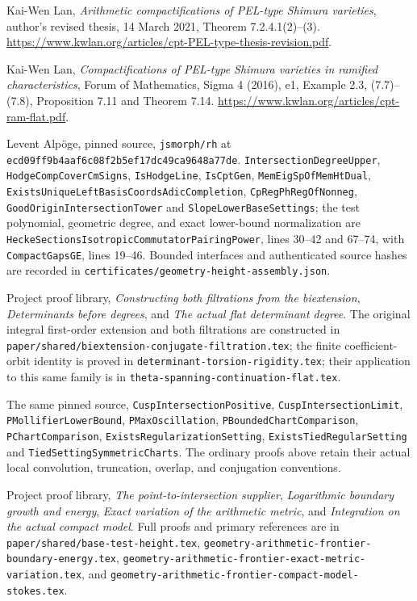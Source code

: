 Kai-Wen Lan, \emph{Arithmetic compactifications of PEL-type Shimura
varieties}, author's revised thesis, 14 March 2021,
Theorem 7.2.4.1(2)--(3).
\url{https://www.kwlan.org/articles/cpt-PEL-type-thesis-revision.pdf}.

Kai-Wen Lan, \emph{Compactifications of PEL-type Shimura varieties
in ramified characteristics}, Forum of Mathematics, Sigma 4 (2016), e1,
Example 2.3, (7.7)--(7.8), Proposition 7.11 and Theorem 7.14.
\url{https://www.kwlan.org/articles/cpt-ram-flat.pdf}.

Levent Alp\"oge, pinned source, \texttt{jsmorph/rh} at
\texttt{ecd09ff9b4aaf6c08f2b5ef17dc49ca9648a77de}.
\texttt{IntersectionDegreeUpper},
\texttt{HodgeCompCoverCmSigns},
\texttt{IsHodgeLine}, \texttt{IsCptGen},
\texttt{MemEigSpOfMemHtDual},
\texttt{ExistsUniqueLeftBasisCoordsAdicCompletion},
\texttt{CpRegPhRegOfNonneg},
\texttt{GoodOriginIntersectionTower} and
\texttt{SlopeLowerBaseSettings}; the test polynomial, geometric degree,
and exact lower-bound normalization are
\texttt{HeckeSectionsIsotropicCommutatorPairingPower}, lines 30--42
and 67--74, with \texttt{CompactGapsGE}, lines 19--46.
Bounded interfaces and authenticated source hashes are recorded in
\texttt{certificates/geometry-height-assembly.json}.

Project proof library,
\emph{Constructing both filtrations from the biextension},
\emph{Determinants before degrees}, and
\emph{The actual flat determinant degree}.
The original integral first-order extension and both filtrations
are constructed in \texttt{paper/shared/biextension-conjugate-filtration.tex};
the finite coefficient-orbit identity is proved in
\texttt{determinant-torsion-rigidity.tex}; their application to this
same family is in \texttt{theta-spanning-continuation-flat.tex}.

The same pinned source,
\texttt{CuspIntersectionPositive}, \texttt{CuspIntersectionLimit},
\texttt{PMollifierLowerBound}, \texttt{PMaxOscillation},
\texttt{PBoundedChartComparison}, \texttt{PChartComparison},
\texttt{ExistsRegularizationSetting},
\texttt{ExistsTiedRegularSetting} and
\texttt{TiedSettingSymmetricCharts}.
The ordinary proofs above retain their actual local convolution,
truncation, overlap, and conjugation conventions.

Project proof library,
\emph{The point-to-intersection supplier},
\emph{Logarithmic boundary growth and energy},
\emph{Exact variation of the arithmetic metric}, and
\emph{Integration on the actual compact model}.
Full proofs and primary references are in
\texttt{paper/shared/base-test-height.tex},
\texttt{geometry-arithmetic-frontier-\allowbreak boundary-energy.tex},
\texttt{geometry-arithmetic-frontier-\allowbreak exact-metric-variation.tex}, and
\texttt{geometry-arithmetic-frontier-\allowbreak compact-model-stokes.tex}.

